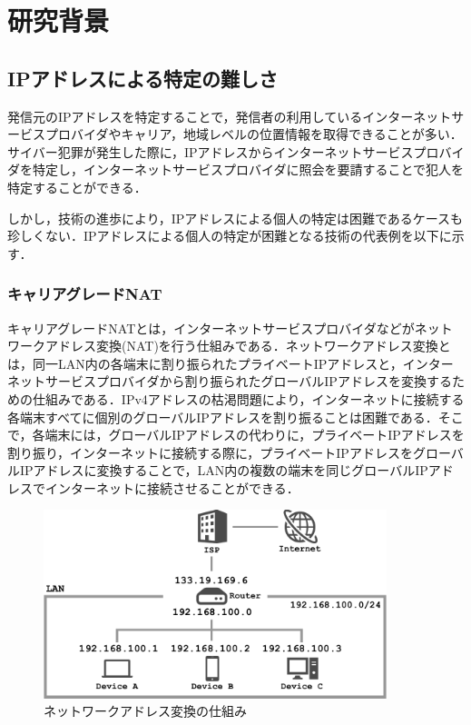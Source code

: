\documentclass[10pt, a4paper]{jreport}
\begin{document}
\chapter{研究背景}\label{sec: research_background}
\section{IPアドレスによる特定の難しさ}
発信元のIPアドレスを特定することで，発信者の利用しているインターネットサービスプロバイダやキャリア，地域レベルの位置情報を取得できることが多い．サイバー犯罪が発生した際に，IPアドレスからインターネットサービスプロバイダを特定し，インターネットサービスプロバイダに照会を要請することで犯人を特定することができる．

しかし，技術の進歩により，IPアドレスによる個人の特定は困難であるケースも珍しくない．IPアドレスによる個人の特定が困難となる技術の代表例を以下に示す．

\subsection{キャリアグレードNAT}
キャリアグレードNATとは，インターネットサービスプロバイダなどがネットワークアドレス変換(NAT)を行う仕組みである．ネットワークアドレス変換とは，同一LAN内の各端末に割り振られたプライベートIPアドレスと，インターネットサービスプロバイダから割り振られたグローバルIPアドレスを変換するための仕組みである．IPv4アドレスの枯渇問題により，インターネットに接続する各端末すべてに個別のグローバルIPアドレスを割り振ることは困難である．そこで，各端末には，グローバルIPアドレスの代わりに，プライベートIPアドレスを割り振り，インターネットに接続する際に，プライベートIPアドレスをグローバルIPアドレスに変換することで，LAN内の複数の端末を同じグローバルIPアドレスでインターネットに接続させることができる．

\begin{figure}[H]
	\begin{center}
		\includegraphics[width=100mm]{figures/nat.pdf}
	\end{center}
	\caption{ネットワークアドレス変換の仕組み}
	\label{fig: nat}
\end{figure}
\end{document}
